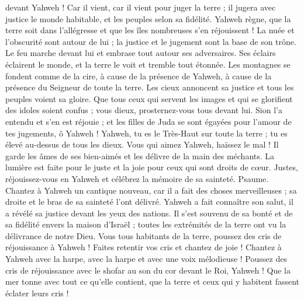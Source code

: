 \begin{multicols}{2}
devant Yahweh ! Car il vient, car il vient pour juger la terre ; il jugera avec justice le monde habitable, et les peuples selon sa fidélité.
\VerseOne{}Yahweh règne, que la terre soit dans l'allégresse et que les îles nombreuses s'en réjouissent !
La nuée et l'obscurité sont autour de lui ; la justice et le jugement sont la base de son trône.
Le feu marche devant lui et embrase tout autour ses adversaires.
Ses éclairs éclairent le monde, et la terre le voit et tremble tout étonnée.
Les montagnes se fondent comme de la cire, à cause de la présence de Yahweh, à cause de la présence du Seigneur de toute la terre.
Les cieux annoncent sa justice et tous les peuples voient sa gloire.
Que tous ceux qui servent les images et qui se glorifient des idoles soient confus ; vous dieux, prosternez-vous tous devant lui.
Sion l'a entendu et s'en est réjouie ; et les filles de Juda se sont égayées pour l'amour de tes jugements, ô Yahweh !
Yahweh, tu es le Très-Haut sur toute la terre ; tu es élevé au-dessus de tous les dieux.
Vous qui aimez Yahweh, haïssez le mal ! Il garde les âmes de ses bien-aimés et les délivre de la main des méchants.
La lumière est faite pour le juste et la joie pour ceux qui sont droits de cœur.
Justes, réjouissez-vous en Yahweh et célébrez la mémoire de sa sainteté.
\VerseOne{}Psaume. Chantez à Yahweh un cantique nouveau, car il a fait des choses merveilleuses ; sa droite et le bras de sa sainteté l'ont délivré.
Yahweh a fait connaître son salut, il a révélé sa justice devant les yeux des nations.
Il s'est souvenu de sa bonté et de sa fidélité envers la maison d'Israël ; toutes les extrémités de la terre ont vu la délivrance de notre Dieu.
Vous tous habitants de la terre, poussez des cris de réjouissance à Yahweh ! Faites retentir vos cris et chantez de joie !
Chantez à Yahweh avec la harpe, avec la harpe et avec une voix mélodieuse !
Poussez des cris de réjouissance avec le shofar au son du cor devant le Roi, Yahweh !
Que la mer tonne avec tout ce qu'elle contient, que la terre et ceux qui y habitent fassent éclater leurs cris !

\end{multicols}
